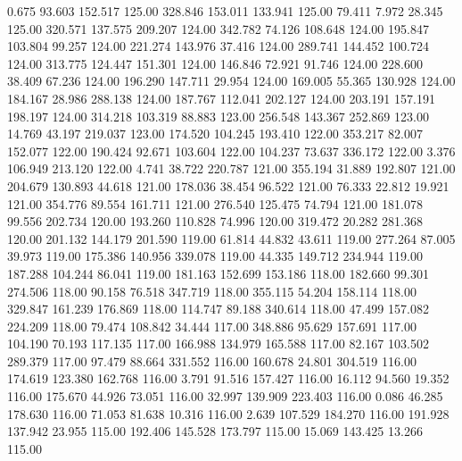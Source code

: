    0.675   93.603  152.517       125.00
 328.846  153.011  133.941       125.00
  79.411    7.972   28.345       125.00
 320.571  137.575  209.207       124.00
 342.782   74.126  108.648       124.00
 195.847  103.804   99.257       124.00
 221.274  143.976   37.416       124.00
 289.741  144.452  100.724       124.00
 313.775  124.447  151.301       124.00
 146.846   72.921   91.746       124.00
 228.600   38.409   67.236       124.00
 196.290  147.711   29.954       124.00
 169.005   55.365  130.928       124.00
 184.167   28.986  288.138       124.00
 187.767  112.041  202.127       124.00
 203.191  157.191  198.197       124.00
 314.218  103.319   88.883       123.00
 256.548  143.367  252.869       123.00
  14.769   43.197  219.037       123.00
 174.520  104.245  193.410       122.00
 353.217   82.007  152.077       122.00
 190.424   92.671  103.604       122.00
 104.237   73.637  336.172       122.00
   3.376  106.949  213.120       122.00
   4.741   38.722  220.787       121.00
 355.194   31.889  192.807       121.00
 204.679  130.893   44.618       121.00
 178.036   38.454   96.522       121.00
  76.333   22.812   19.921       121.00
 354.776   89.554  161.711       121.00
 276.540  125.475   74.794       121.00
 181.078   99.556  202.734       120.00
 193.260  110.828   74.996       120.00
 319.472   20.282  281.368       120.00
 201.132  144.179  201.590       119.00
  61.814   44.832   43.611       119.00
 277.264   87.005   39.973       119.00
 175.386  140.956  339.078       119.00
  44.335  149.712  234.944       119.00
 187.288  104.244   86.041       119.00
 181.163  152.699  153.186       118.00
 182.660   99.301  274.506       118.00
  90.158   76.518  347.719       118.00
 355.115   54.204  158.114       118.00
 329.847  161.239  176.869       118.00
 114.747   89.188  340.614       118.00
  47.499  157.082  224.209       118.00
  79.474  108.842   34.444       117.00
 348.886   95.629  157.691       117.00
 104.190   70.193  117.135       117.00
 166.988  134.979  165.588       117.00
  82.167  103.502  289.379       117.00
  97.479   88.664  331.552       116.00
 160.678   24.801  304.519       116.00
 174.619  123.380  162.768       116.00
   3.791   91.516  157.427       116.00
  16.112   94.560   19.352       116.00
 175.670   44.926   73.051       116.00
  32.997  139.909  223.403       116.00
   0.086   46.285  178.630       116.00
  71.053   81.638   10.316       116.00
   2.639  107.529  184.270       116.00
 191.928  137.942   23.955       115.00
 192.406  145.528  173.797       115.00
  15.069  143.425   13.266       115.00
